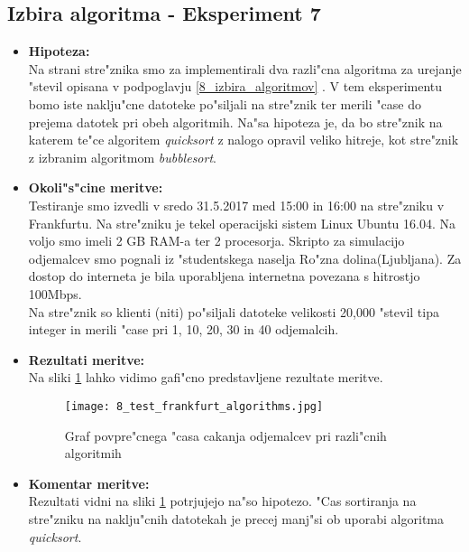     \subsection{Izbira algoritma - Eksperiment 7}
    \begin{itemize}
    	\item \textbf{Hipoteza: }  \\
    		Na strani stre"znika smo za implementirali dva razli"cna algoritma za urejanje "stevil opisana v podpoglavju \ref{8_izbira_algoritmov} . V tem eksperimentu bomo iste naklju"cne datoteke po"siljali na stre"znik ter merili "case do prejema datotek pri obeh algoritmih.
		Na"sa hipoteza je, da bo stre"znik na katerem te"ce algoritem \textit{quicksort} z nalogo opravil veliko hitreje, kot stre"znik z izbranim algoritmom \textit{bubblesort}.

    	\item \textbf{Okoli"s"cine meritve: } \\
    		Testiranje smo izvedli v sredo 31.5.2017 med 15:00 in 16:00 na stre"zniku v Frankfurtu. Na stre"zniku je tekel operacijski sistem Linux Ubuntu 16.04. Na voljo smo imeli 2 GB RAM-a ter 2 procesorja. Skripto za simulacijo odjemalcev smo pognali iz "studentskega naselja Ro"zna dolina(Ljubljana). Za dostop do interneta je bila uporabljena internetna povezana s hitrostjo 100Mbps.\\ Na stre"znik so klienti (niti) po"siljali datoteke velikosti 20,000 "stevil tipa integer in merili "case pri 1, 10, 20, 30 in 40 odjemalcih.

     	\item \textbf{Rezultati meritve: }  \\
		Na sliki \ref{8_graf_algorithms} lahko vidimo gafi"cno predstavljene rezultate meritve.
    		\begin{figure}[h]
  		\centering
  		  \texttt{[image: 8\_test\_frankfurt\_algorithms.jpg]}
  		\caption{Graf povpre"cnega "casa cakanja odjemalcev pri razli"cnih algoritmih }
  		\label{8_graf_algorithms}
		\end{figure}
    		\newpage

    	\item \textbf{Komentar meritve: } \\
    		Rezultati vidni na sliki  \ref{8_graf_algorithms} potrjujejo na"so hipotezo. "Cas sortiranja na stre"zniku na naklju"cnih datotekah je precej manj"si ob uporabi algoritma \textit{quicksort}.
    \end{itemize}


